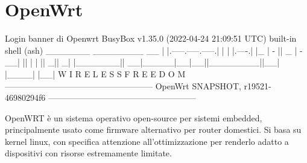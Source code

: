 \section{OpenWrt \ok}

\begin{bashcode}{Login banner di Openwrt}{}
BusyBox v1.35.0 (2022-04-24 21:09:51 UTC) built-in shell (ash)
_______                     ________        __
|       |.-----.-----.-----.|  |  |  |.----.|  |_
|   -   ||  _  |  -__|     ||  |  |  ||   _||   _|
|_______||   __|_____|__|__||________||__|  |____|
|__| W I R E L E S S   F R E E D O M
-----------------------------------------------------
OpenWrt SNAPSHOT, r19521-46980294f6
-----------------------------------------------------
\end{bashcode}

OpenWRT è un sistema operativo open-source per sistemi embedded, principalmente usato come firmware alternativo per router domestici. Si basa su kernel linux, con specifica attenzione all'ottimizzazione per renderlo adatto a dispositivi con risorse estremamente limitate.

